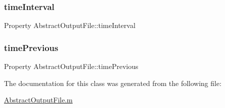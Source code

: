 \subsubsection{\texorpdfstring{time\+Interval}{timeInterval}}
{\footnotesize\ttfamily Property Abstract\+Output\+File\+::time\+Interval\hspace{0.3cm}{\ttfamily [protected]}}

\mbox{\label{class_abstract_output_file_a17c97e73ce6a68145c4fd5e33f4bb757}} 
\subsubsection{\texorpdfstring{time\+Previous}{timePrevious}}
{\footnotesize\ttfamily Property Abstract\+Output\+File\+::time\+Previous\hspace{0.3cm}{\ttfamily [protected]}}



The documentation for this class was generated from the following file\+:\begin{DoxyCompactItemize}
\item 
\hyperlink{_abstract_output_file_8m}{Abstract\+Output\+File.\+m}\end{DoxyCompactItemize}
